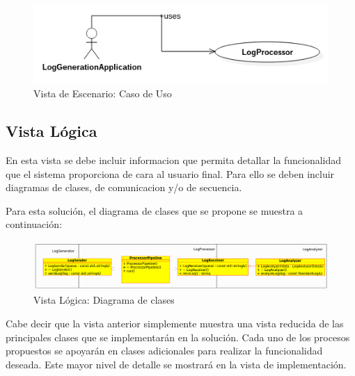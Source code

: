 \documentclass[11pt]{article}
\begin{document}
\begin{center}
 \begin{figure}[H]
 \begin{center}
   \includegraphics[width=15cm]{img/use_case00.png}
   \caption{Vista de Escenario: Caso de Uso}
   \label{fig:4plus1views}
 \end{center}
 \end{figure}
\end{center}

\subsection{Vista Lógica}

En esta vista se debe incluir informacion que permita detallar la funcionalidad que el sistema proporciona de cara al usuario final. Para ello se deben incluir diagramas de clases, de comunicacion y/o de secuencia.

Para esta solución, el diagrama de clases que se propone se muestra a continuación:

\begin{center}
 \begin{figure}[H]
 \begin{center}
   \includegraphics[width=15cm]{img/classes_summary01.png}
   \caption{Vista Lógica: Diagrama de clases}
   \label{fig:4plus1views}
 \end{center}
 \end{figure}
\end{center}

Cabe decir que la vista anterior simplemente muestra una vista reducida de las principales clases que se implementarán en la solución. Cada uno de los procesos propuestos se apoyarán en clases adicionales para realizar la funcionalidad deseada. Este mayor nivel de detalle se mostrará en la vista de implementación.
\end{document}
